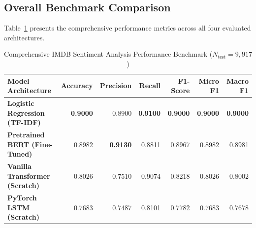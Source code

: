 \subsection{Overall Benchmark Comparison}
Table~\ref{tab:exp7_master_benchmark} presents the comprehensive performance metrics across all four evaluated architectures.
\begin{table}[H]
\centering
\small
\caption{Comprehensive IMDB Sentiment Analysis Performance Benchmark ($N_{\text{test}} = 9,917$)}
\label{tab:exp7_master_benchmark}
\begin{tabularx}{\textwidth}{lrrrrrr}
\toprule
\textbf{Model Architecture} & \textbf{Accuracy} & \textbf{Precision} & \textbf{Recall} & \textbf{F1-Score} & \textbf{Micro F1} & \textbf{Macro F1} \\
\midrule
\textbf{Logistic Regression (TF-IDF)} & \textbf{0.9000} & 0.8900 & \textbf{0.9100} & \textbf{0.9000} & \textbf{0.9000} & \textbf{0.9000} \\
\textbf{Pretrained BERT (Fine-Tuned)} & 0.8982 & \textbf{0.9130} & 0.8811 & 0.8967 & 0.8982 & 0.8981 \\
\textbf{Vanilla Transformer (Scratch)} & 0.8026 & 0.7510 & 0.9074 & 0.8218 & 0.8026 & 0.8002 \\
\textbf{PyTorch LSTM (Scratch)} & 0.7683 & 0.7487 & 0.8101 & 0.7782 & 0.7683 & 0.7678 \\
\bottomrule
\end{tabularx}
\end{table}

